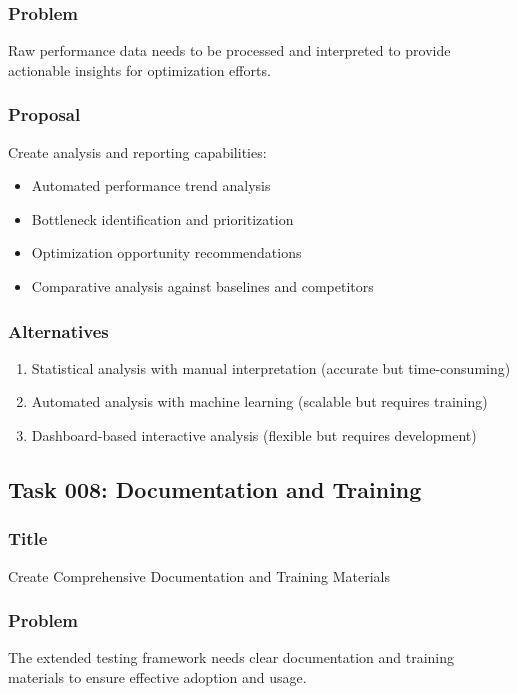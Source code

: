 \documentclass[11pt,a4paper]{article}
\begin{document}
\subsubsection{Problem}
Raw performance data needs to be processed and interpreted to provide actionable insights for optimization efforts.

\subsubsection{Proposal}
Create analysis and reporting capabilities:
\begin{itemize}
    \item Automated performance trend analysis
    \item Bottleneck identification and prioritization
    \item Optimization opportunity recommendations
    \item Comparative analysis against baselines and competitors
\end{itemize}

\subsubsection{Alternatives}
\begin{enumerate}
    \item Statistical analysis with manual interpretation (accurate but time-consuming)
    \item Automated analysis with machine learning (scalable but requires training)
    \item Dashboard-based interactive analysis (flexible but requires development)
\end{enumerate}

\subsection{Task 008: Documentation and Training}

\subsubsection{Title}
Create Comprehensive Documentation and Training Materials

\subsubsection{Problem}
The extended testing framework needs clear documentation and training materials to ensure effective adoption and usage.
\end{document}
